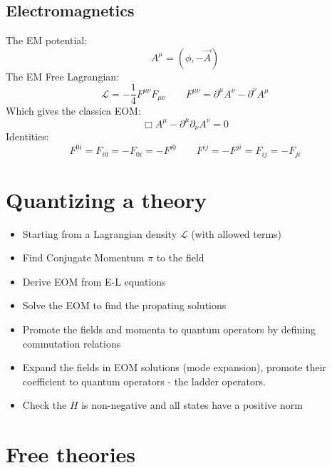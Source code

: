 \documentclass{article}
\begin{document}
\subsection{Electromagnetics}
The EM potential:
\begin{equation*}
    A^\mu = (\phi, -\vec{A})
\end{equation*}
The EM Free Lagrangian:
\begin{equation*}
    \mathcal{L} = -\frac{1}{4}F^{\mu\nu}F_{\mu\nu}
    \qquad
    F^{\mu\nu} = \partial^\mu A^\nu - \partial^\nu A^\mu
\end{equation*}
Which gives the classica EOM:
\begin{equation*}
    \Box A^\mu - \partial^\mu \partial_\nu A^\nu = 0
\end{equation*}
Identities:
\begin{equation*}
    F^{0i} = F_{i0} = -F_{0i} = -F^{i0}
    \qquad
    F^{ij} = -F^{ji} = F_{ij} = -F_{ji}
\end{equation*}

\section{Quantizing a theory}
\begin{itemize}
    \item Starting from a Lagrangian density $\mathcal{L}$ (with allowed terms)
    \item Find Conjugate Momentum $\pi$ to the field
    \item Derive EOM from E-L equations
    \item Solve the EOM to find the propating solutions
    \item Promote the fields and momenta to quantum operators by defining commutation relations
    \item Expand the fields in EOM solutions (mode expansion), promote their coefficient to quantum operators - the ladder operators.
    \item Check the $H$ is non-negative and all states have a positive norm
\end{itemize}
\section{Free theories}
\end{document}
